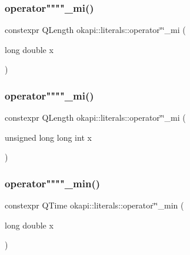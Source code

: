 \mbox{\label{namespaceokapi_1_1literals_a726879fc529f4296a8b9e2a498f2cb7f}} 
\subsubsection{\texorpdfstring{operator""""\_mi()}{operator""\_mi()}\hspace{0.1cm}{\footnotesize\ttfamily [1/2]}}
{\footnotesize\ttfamily constexpr Q\+Length okapi\+::literals\+::operator\char`\"{}\char`\"{}\+\_\+mi (\begin{DoxyParamCaption}\item[{long double}]{x }\end{DoxyParamCaption})}

\mbox{\label{namespaceokapi_1_1literals_a31846758da45d0f07eaf9110e4f1a4d8}} 
\subsubsection{\texorpdfstring{operator""""\_mi()}{operator""\_mi()}\hspace{0.1cm}{\footnotesize\ttfamily [2/2]}}
{\footnotesize\ttfamily constexpr Q\+Length okapi\+::literals\+::operator\char`\"{}\char`\"{}\+\_\+mi (\begin{DoxyParamCaption}\item[{unsigned long long int}]{x }\end{DoxyParamCaption})}

\mbox{\label{namespaceokapi_1_1literals_aa2bda939825ca29b4d2846fe8b768218}} 
\subsubsection{\texorpdfstring{operator""""\_min()}{operator""\_min()}\hspace{0.1cm}{\footnotesize\ttfamily [1/2]}}
{\footnotesize\ttfamily constexpr Q\+Time okapi\+::literals\+::operator\char`\"{}\char`\"{}\+\_\+min (\begin{DoxyParamCaption}\item[{long double}]{x }\end{DoxyParamCaption})}

